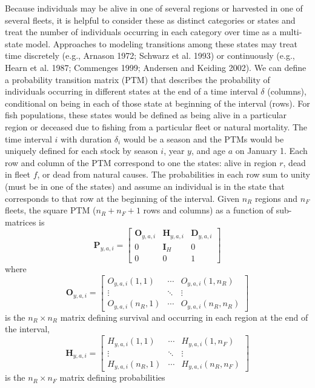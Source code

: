 \documentclass[
]{article}
\begin{document}
Because individuals may be alive in one of several regions or harvested
in one of several fleets, it is helpful to consider these as distinct
categories or states and treat the number of individuals occurring in
each category over time as a multi-state model. Approaches to modeling
transitions among these states may treat time discretely (e.g., Arnason
1972; Schwarz et al. 1993) or continuously (e.g., Hearn et al. 1987;
Commenges 1999; Andersen and Keiding 2002). We can define a probability
transition matrix (PTM) that describes the probability of individuals
occurring in different states at the end of a time interval \(\delta\)
(columns), conditional on being in each of those state at beginning of
the interval (rows). For fish populations, these states would be defined
as being alive in a particular region or deceased due to fishing from a
particular fleet or natural mortality. The time interval \(i\) with
duration \(\delta_i\) would be a season and the PTMs would be uniquely
defined for each stock by season \(i\), year \(y\), and age \(a\) on
January 1. Each row and column of the PTM correspond to one the states:
alive in region \(r\), dead in fleet \(f\), or dead from natural causes.
The probabilities in each row sum to unity (must be in one of the
states) and assume an individual is in the state that corresponds to
that row at the beginning of the interval. Given \(n_R\) regions and
\(n_F\) fleets, the square PTM (\(n_R + n_F + 1\) rows and columns) as a
function of sub-matrices is \begin{equation}\label{eq:ptm}
  \mathbf{P}_{y,a,i} = \begin{bmatrix}
    \mathbf{O}_{y,a,i} & \mathbf{H}_{y,a,i} & \mathbf{D}_{y,a,i} \\
    0 & \mathbf{I}_{H} & 0\\
    0 & 0 & 1
  \end{bmatrix}
\end{equation} where \begin{equation*}
  \mathbf{O}_{y,a,i} = 
  \begin{bmatrix}
    O_{y,a,i}(1,1) & \cdots & O_{y,a,i}(1,n_R) \\
    \vdots & \ddots & \vdots \\
    O_{y,a,i}(n_R,1) & \cdots & O_{y,a,i}(n_R,n_R)
  \end{bmatrix}
\end{equation*} is the \(n_R \times n_R\) matrix defining survival and
occurring in each region at the end of the interval, \begin{equation*} 
  \mathbf{H}_{y,a,i} = 
  \begin{bmatrix}
    H_{y,a,i}(1,1) & \cdots & H_{y,a,i}(1,n_F) \\
    \vdots & \ddots & \vdots \\
    H_{y,a,i}(n_R,1) & \cdots & H_{y,a,i}(n_R,n_F)
  \end{bmatrix}
\end{equation*} is the \(n_R \times n_F\) matrix defining probabilities
\end{document}
